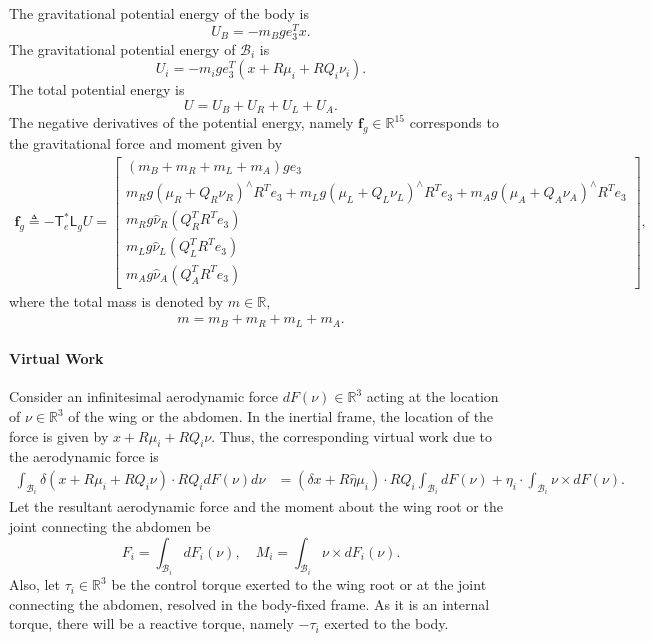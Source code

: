 \documentclass[conf]{new-aiaa}
\newcommand{\T}{\ensuremath{\mathsf{T}}}
\renewcommand{\L}{\ensuremath{\mathsf{L}}}
\renewcommand{\Re}{\ensuremath{\mathbb{R}}}
\begin{document}
The gravitational potential energy of the body is 
\[
    U_B = -m_B g e_3^T x.
\]
The gravitational potential energy of $\mathcal{B}_i$ is
\[
    U_i = -m_ig e_3^T (x + R\mu_i + RQ_i \nu_i).
\]
The total potential energy is
\begin{equation}
    U = U_B + U_R + U_L + U_A.
\end{equation}
The negative derivatives of the potential energy, namely $\mathbf{f}_g\in\Re^{15}$ corresponds to the gravitational force and moment given by
\begin{align}
    \mathbf{f}_g \triangleq - \T^*_e\L_g U = \begin{bmatrix}
     (m_B+m_R+m_L+ m_A )g e_3\\
    m_Rg (\mu_R + Q_R \nu_R)^\wedge {R^T e_3}  + m_L g (\mu_L + Q_L \nu_L)^\wedge {R^T e_3}  + m_A g (\mu_A + Q_A \nu_A)^\wedge {R^T e_3}  \\
    m_R g \hat\nu_R (Q_R^T R^T e_3) \\
    m_L g \hat\nu_L (Q_L^T R^T e_3) \\
    m_A g \hat\nu_A (Q_A^T R^T e_3) 
\end{bmatrix},
\end{align}
where the total mass is denoted by $m\in\Re$,
\begin{align}
    m = m_B + m_R + m_L + m_A.
\end{align}
\nomenclature{$m\in\Re$}{total mass, i.e., $m = m_B + m_R + m_L + m_A.$}


\paragraph{Virtual Work}

Consider an infinitesimal aerodynamic force $dF(\nu)\in\Re^3$ acting at the location of $\nu\in\Re^3$ of the wing or the abdomen. 
In the inertial frame, the location of the force is given by $x+ R\mu_i + R Q_i\nu$. 
Thus, the corresponding virtual work due to the aerodynamic force is
\begin{align*}
    \int_{\mathcal{B}_i} \delta(x + R\mu_i + R Q_i\nu) \cdot R Q_i dF(\nu) d\nu
                      & =  (\delta x + R\hat\eta \mu_i) \cdot R Q_i \int_{\mathcal{B}_i} dF(\nu) + \eta_i \cdot \int_{\mathcal{B}_i} \nu \times dF(\nu).
\end{align*}
Let the resultant aerodynamic force and the moment about the wing root or the joint connecting the abdomen be
\[
    F_i = \int_{\mathcal{B}_i} dF_i(\nu) ,\quad M_i = \int_{\mathcal{B}_i} \nu\times dF_i(\nu).
\]
Also, let $\tau_i\in\Re^3$ be the control torque exerted to the wing root or at the joint connecting the abdomen, resolved in the body-fixed frame. 
As it is an internal torque, there will be a reactive torque, namely $-\tau_i$ exerted to the body. 
\end{document}
